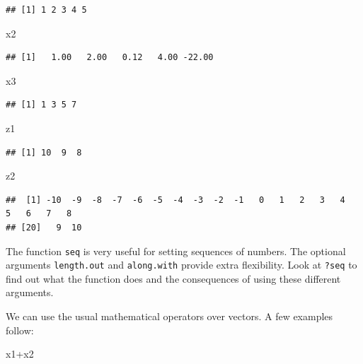 \documentclass[
]{article}
\newenvironment{Shaded}{\begin{snugshade}}{\end{snugshade}}
\newcommand{\NormalTok}[1]{#1}
\newcommand{\SpecialCharTok}[1]{\textcolor[rgb]{0.00,0.00,0.00}{#1}}
\begin{document}
\begin{verbatim}
## [1] 1 2 3 4 5
\end{verbatim}

\begin{Shaded}
\begin{Highlighting}[]
\NormalTok{x2}
\end{Highlighting}
\end{Shaded}

\begin{verbatim}
## [1]   1.00   2.00   0.12   4.00 -22.00
\end{verbatim}

\begin{Shaded}
\begin{Highlighting}[]
\NormalTok{x3}
\end{Highlighting}
\end{Shaded}

\begin{verbatim}
## [1] 1 3 5 7
\end{verbatim}

\begin{Shaded}
\begin{Highlighting}[]
\NormalTok{z1}
\end{Highlighting}
\end{Shaded}

\begin{verbatim}
## [1] 10  9  8
\end{verbatim}

\begin{Shaded}
\begin{Highlighting}[]
\NormalTok{z2}
\end{Highlighting}
\end{Shaded}

\begin{verbatim}
##  [1] -10  -9  -8  -7  -6  -5  -4  -3  -2  -1   0   1   2   3   4   5   6   7   8
## [20]   9  10
\end{verbatim}

The function \texttt{seq} is very useful for setting sequences of
numbers. The optional arguments \texttt{length.out} and
\texttt{along.with} provide extra flexibility. Look at \texttt{?seq} to
find out what the function does and the consequences of using these
different arguments.

We can use the usual mathematical operators over vectors. A few examples
follow:

\begin{Shaded}
\begin{Highlighting}[]
\NormalTok{x1}\SpecialCharTok{+}\NormalTok{x2}
\end{Highlighting}
\end{Shaded}
\end{document}
